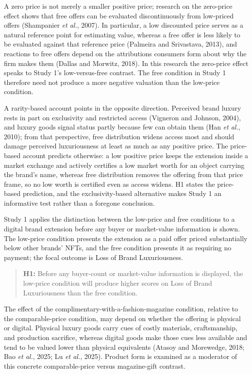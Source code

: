 \documentclass[12pt, a4paper]{article}
\begin{document}
A zero price is not merely a smaller positive price; research on the zero-price effect shows that free offers can be evaluated discontinuously from low-priced offers (Shampanier \emph{et al.}, 2007). In particular, a low discounted price serves as a natural reference point for estimating value, whereas a free offer is less likely to be evaluated against that reference price (Palmeira and Srivastava, 2013), and reactions to free offers depend on the attributions consumers form about why the firm makes them (Dallas and Morwitz, 2018). In this research the zero-price effect speaks to Study 1's low-versus-free contrast. The free condition in Study 1 therefore need not produce a more negative valuation than the low-price condition.

A rarity-based account points in the opposite direction. Perceived brand luxury rests in part on exclusivity and restricted access (Vigneron and Johnson, 2004), and luxury goods signal status partly because few can obtain them (Han \emph{et al.}, 2010); from that perspective, free distribution widens access most and should damage perceived luxuriousness at least as much as any positive price. The price-based account predicts otherwise: a low positive price keeps the extension inside a market exchange and actively certifies a low market worth for an object carrying the brand's name, whereas free distribution removes the offering from that price frame, so no low worth is certified even as access widens. H1 states the price-based prediction, and the exclusivity-based alternative makes Study 1 an informative test rather than a foregone conclusion.

Study 1 applies the distinction between the low-price and free conditions to a digital brand extension before any buyer or market-value information is shown. The low-price condition presents the extension as a paid offer priced substantially below other brands' NFTs, and the free condition presents it as requiring no payment; the focal outcome is Loss of Brand Luxuriousness.

\begin{quote}
\textbf{H1:} Before any buyer-count or market-value information is displayed, the low-price condition will produce higher scores on Loss of Brand Luxuriousness than the free condition.
\end{quote}

The effect of the complimentary-with-a-fashion-magazine condition, relative to the comparable-price condition, may depend on whether the offering is physical or digital. Physical luxury goods carry cues of costly materials, craftsmanship, and production sacrifice, whereas digital goods make those cues less available and tend to be valued lower than physical equivalents (Atasoy and Morewedge, 2018; Bao \emph{et al.}, 2025; Lu \emph{et al.}, 2025). Product form is examined as a moderator of this concrete comparable-price versus magazine-gift contrast.
\end{document}
